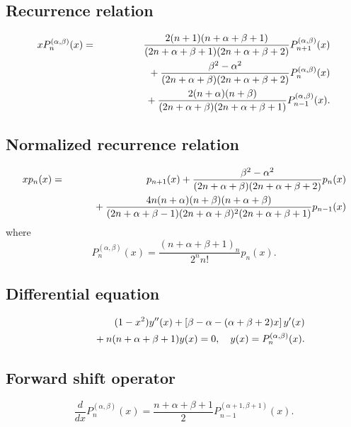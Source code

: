 \documentclass[envcountchap,graybox]{svmono}
\newcommand{\mathindent}{\hspace{7.5mm}}
\begin{document}
\subsection*{Recurrence relation}
\begin{eqnarray}
\label{RecJacobi}
xP_n^{(\alpha,\beta)}(x)&=&\frac{2(n+1)(n+\alpha+\beta+1)}{(2n+\alpha+\beta+1)(2n+\alpha+\beta+2)}P_{n+1}^{(\alpha,\beta)}(x)\nonumber\\
& &{}\mathindent{}+\frac{\beta^2-\alpha^2}{(2n+\alpha+\beta)(2n+\alpha+\beta+2)}P_n^{(\alpha,\beta)}(x)\nonumber\\
& &{}\mathindent\mathindent{}+\frac{2(n+\alpha)(n+\beta)}{(2n+\alpha+\beta)(2n+\alpha+\beta+1)}P_{n-1}^{(\alpha,\beta)}(x).
\end{eqnarray}

\subsection*{Normalized recurrence relation}
\begin{eqnarray}
\label{NormRecJacobi}
xp_n(x)&=&p_{n+1}(x)+\frac{\beta^2-\alpha^2}{(2n+\alpha+\beta)(2n+\alpha+\beta+2)}p_n(x)\nonumber\\
& &{}\mathindent{}+\frac{4n(n+\alpha)(n+\beta)(n+\alpha+\beta)}
{(2n+\alpha+\beta-1)(2n+\alpha+\beta)^2(2n+\alpha+\beta+1)}p_{n-1}(x)
\end{eqnarray}
where
$$P_n^{(\alpha,\beta)}(x)=\frac{(n+\alpha+\beta+1)_n}{2^nn!}p_n(x).$$

\subsection*{Differential equation}
\begin{eqnarray}
\label{dvJacobi}
& &(1-x^2)y''(x)+\left[\beta-\alpha-(\alpha+\beta+2)x\right]y'(x)\nonumber\\
& &{}\mathindent{}+n(n+\alpha+\beta+1)y(x)=0,\quad y(x)=P_n^{(\alpha,\beta)}(x).
\end{eqnarray}

\subsection*{Forward shift operator}
\begin{equation}
\label{shift1Jacobi}
\frac{d}{dx}P_n^{(\alpha,\beta)}(x)=\frac{n+\alpha+\beta+1}{2}P_{n-1}^{(\alpha+1,\beta+1)}(x).
\end{equation}
\end{document}
